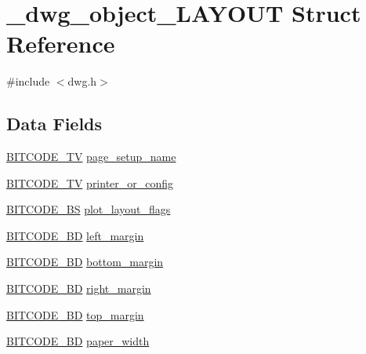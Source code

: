 \hypertarget{struct__dwg__object__LAYOUT}{\section{\-\_\-dwg\-\_\-object\-\_\-\-L\-A\-Y\-O\-U\-T \-Struct \-Reference}
\label{struct__dwg__object__LAYOUT}
}


{\ttfamily \#include $<$dwg.\-h$>$}

\subsection*{\-Data \-Fields}
\begin{DoxyCompactItemize}
\item 
\hyperlink{dwg_8h_a2a7e040c6e36ca039b03608679ecaf7c}{\-B\-I\-T\-C\-O\-D\-E\-\_\-\-T\-V} \hyperlink{struct__dwg__object__LAYOUT_abb88ecd8db0a6a5b441c3ce9117ff83d}{page\-\_\-setup\-\_\-name}
\item 
\hyperlink{dwg_8h_a2a7e040c6e36ca039b03608679ecaf7c}{\-B\-I\-T\-C\-O\-D\-E\-\_\-\-T\-V} \hyperlink{struct__dwg__object__LAYOUT_a89a36eff0baa455e75adc23b82d5a6b4}{printer\-\_\-or\-\_\-config}
\item 
\hyperlink{dwg_8h_a94297606fbd4a4ff97e8add284af0809}{\-B\-I\-T\-C\-O\-D\-E\-\_\-\-B\-S} \hyperlink{struct__dwg__object__LAYOUT_a6689fa642db6642e9117146817a44ed7}{plot\-\_\-layout\-\_\-flags}
\item 
\hyperlink{dwg_8h_a3c1e6781466b74ba07785d57da70ed97}{\-B\-I\-T\-C\-O\-D\-E\-\_\-\-B\-D} \hyperlink{struct__dwg__object__LAYOUT_a493d266d221df8a1ff8c06113b102c33}{left\-\_\-margin}
\item 
\hyperlink{dwg_8h_a3c1e6781466b74ba07785d57da70ed97}{\-B\-I\-T\-C\-O\-D\-E\-\_\-\-B\-D} \hyperlink{struct__dwg__object__LAYOUT_a2a95b721c38e4fd5429cfea32ef0ce84}{bottom\-\_\-margin}
\item 
\hyperlink{dwg_8h_a3c1e6781466b74ba07785d57da70ed97}{\-B\-I\-T\-C\-O\-D\-E\-\_\-\-B\-D} \hyperlink{struct__dwg__object__LAYOUT_a3288a0e576053f91f0d3f98dbae35ade}{right\-\_\-margin}
\item 
\hyperlink{dwg_8h_a3c1e6781466b74ba07785d57da70ed97}{\-B\-I\-T\-C\-O\-D\-E\-\_\-\-B\-D} \hyperlink{struct__dwg__object__LAYOUT_aa045c9ca5409acf3f048775c723494cc}{top\-\_\-margin}
\item 
\hyperlink{dwg_8h_a3c1e6781466b74ba07785d57da70ed97}{\-B\-I\-T\-C\-O\-D\-E\-\_\-\-B\-D} \hyperlink{struct__dwg__object__LAYOUT_aa5b20fe9a128550c121e38eb66a94796}{paper\-\_\-width}

\end{DoxyCompactItemize}
